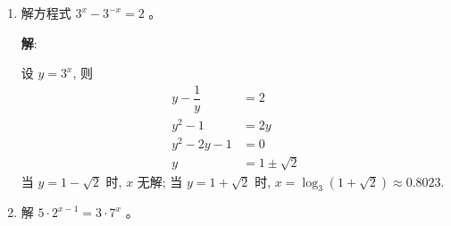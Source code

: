 \documentclass{report}
\newcommand{\sol}{\vspace{0.2cm}\textbf{解}:}
\begin{document}
\begin{multicols*}{2}
\begin{enumerate}[leftmargin=*]
              \sol{}
              \begin{align*}
                  2^{x+y} & = 8     \\
                  x + y   & = 3     \\
                  y       & = 3 - x
              \end{align*}
              设 $t = 2^x$, 则
              \begin{align*}
                  t + 2^{3-x}      & = 9    \\
                  t + \dfrac{8}{t} & = 9    \\
                  t^2 - 9t + 8     & = 0    \\
                  (t - 1)(t - 8)   & = 0    \\
                  t                & = 1, 8
              \end{align*}
              当 $t = 1$ 时, $x = 0$, $y = 3$; 当 $t = 8$ 时, $x = 3$, $y = 0$.

              $\therefore\ \left\{\begin{array}{r}x=0 \\ y=3\end{array}\right.$ 或 $\left\{\begin{array}{r}x=3 \\ y=0\end{array}\right.$.

        \item 解方程式 $3^x-3^{-x}=2$ 。

              \sol{}

              设 $y = 3^x$, 则
              \begin{align*}
                  y - \dfrac{1}{y} & = 2              \\
                  y^2 - 1          & = 2y             \\
                  y^2 - 2y - 1     & = 0              \\
                  y                & = 1 \pm \sqrt{2}
              \end{align*}
              当 $y = 1 - \sqrt{2}$ 时, $x$ 无解; 当 $y = 1 + \sqrt{2}$ 时, $x = \log_3 (1 + \sqrt{2}) \approx 0.8023$.

        \item 解 $5 \cdot 2^{x-1}=3 \cdot 7^x$ 。


\end{enumerate}
\end{multicols*}
\end{document}
